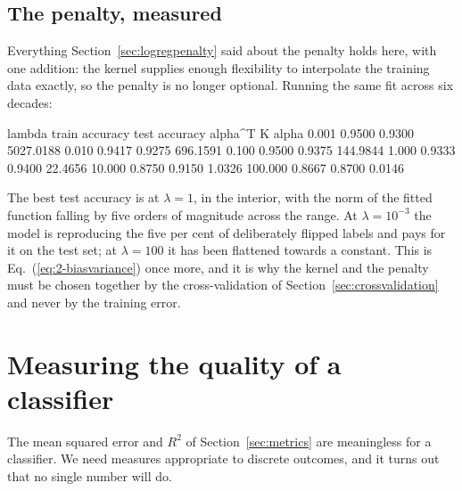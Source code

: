 \subsection{The penalty, measured}
\label{sec:klogregpenalty}

Everything Section~\ref{sec:logregpenalty} said about the penalty holds here,
with one addition: the kernel supplies enough flexibility to interpolate the
training data exactly, so the penalty is no longer optional.  Running the same
fit across six decades:

\begin{Python}{}
   lambda    train accuracy   test accuracy   alpha^T K alpha
     0.001           0.9500          0.9300         5027.0188
     0.010           0.9417          0.9275          696.1591
     0.100           0.9500          0.9375          144.9844
     1.000           0.9333          0.9400           22.4656
    10.000           0.8750          0.9150            1.0326
   100.000           0.8667          0.8700            0.0146
\end{Python}

The best test accuracy is at $\lambda=1$, in the interior, with the norm of the
fitted function falling by five orders of magnitude across the range.  At
$\lambda=10^{-3}$ the model is reproducing the five per cent of deliberately
flipped labels and pays for it on the test set; at $\lambda=100$ it has been
flattened towards a constant.  This is Eq.~(\ref{eq:2-biasvariance}) once
more, and it is why the kernel and the penalty must be chosen together by the
cross-validation of Section~\ref{sec:crossvalidation} and never by the
training error.

\section{Measuring the quality of a classifier}
\label{sec:classmetrics}

The mean squared error and $R^{2}$ of Section~\ref{sec:metrics} are
meaningless for a classifier.  We need measures appropriate to discrete
outcomes, and it turns out that no single number will do.


